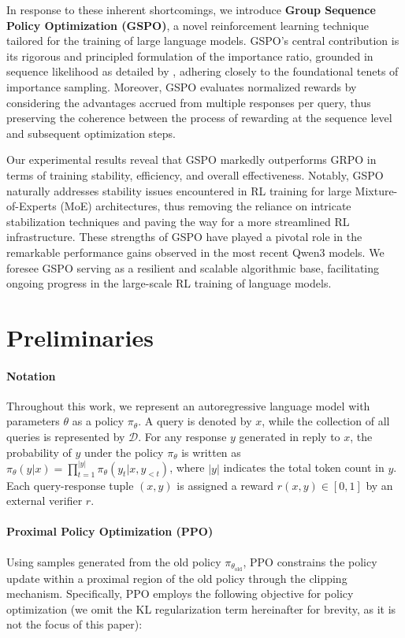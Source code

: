 In response to these inherent shortcomings, we introduce \textbf{Group Sequence Policy Optimization (GSPO)}, a novel reinforcement learning technique tailored for the training of large language models. GSPO’s central contribution is its rigorous and principled formulation of the importance ratio, grounded in sequence likelihood as detailed by \citet{click}, adhering closely to the foundational tenets of importance sampling. Moreover, GSPO evaluates normalized rewards by considering the advantages accrued from multiple responses per query, thus preserving the coherence between the process of rewarding at the sequence level and subsequent optimization steps.

Our experimental results reveal that GSPO markedly outperforms GRPO in terms of training stability, efficiency, and overall effectiveness. Notably, GSPO naturally addresses stability issues encountered in RL training for large Mixture-of-Experts (MoE) architectures, thus removing the reliance on intricate stabilization techniques and paving the way for a more streamlined RL infrastructure. These strengths of GSPO have played a pivotal role in the remarkable performance gains observed in the most recent Qwen3 models. We foresee GSPO serving as a resilient and scalable algorithmic base, facilitating ongoing progress in the large-scale RL training of language models.

\section{Preliminaries}

\paragraph{Notation}
Throughout this work, we represent an autoregressive language model with parameters $\theta$ as a policy $\pi_\theta$. A query is denoted by $x$, while the collection of all queries is represented by $\mathcal{D}$. For any response $y$ generated in reply to $x$, the probability of $y$ under the policy $\pi_\theta$ is written as $\pi_\theta (y | x)=\prod_{t=1}^{|y|} \pi_\theta (y_t | x, y_{<t} )$, where $|y|$ indicates the total token count in $y$. Each query-response tuple $(x, y)$ is assigned a reward $r(x, y) \in [ 0, 1 ]$ by an external verifier $r$.

\paragraph{Proximal Policy Optimization (PPO)} Using samples generated from the old policy $\pi_{\theta_\text{old}}$, PPO \citep{ppo} constrains the policy update within a proximal region of the old policy through the clipping mechanism. Specifically, PPO employs the following objective for policy optimization (we omit the KL regularization term hereinafter for brevity, as it is not the focus of this paper):


